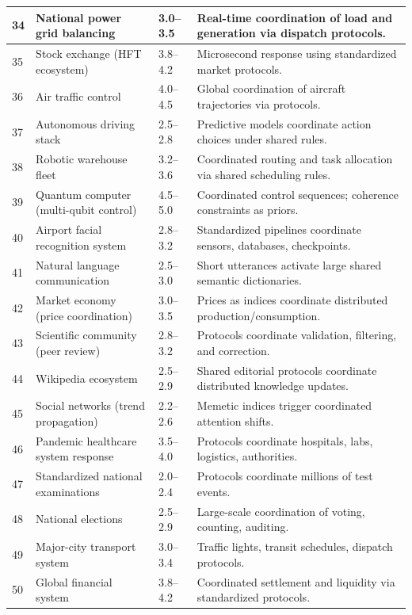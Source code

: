 \documentclass[13pt,a4paper]{article}
\begin{document}
\begin{longtable}{|p{0.8cm}|p{6.2cm}|p{3.0cm}|p{5.7cm}|}
		\hline
		34 & National power grid balancing & 3.0--3.5 & Real-time coordination of load and generation via dispatch protocols. \\
		\hline
		35 & Stock exchange (HFT ecosystem) & 3.8--4.2 & Microsecond response using standardized market protocols. \\
		\hline
		36 & Air traffic control & 4.0--4.5 & Global coordination of aircraft trajectories via protocols. \\
		\hline
		37 & Autonomous driving stack & 2.5--2.8 & Predictive models coordinate action choices under shared rules. \\
		\hline
		38 & Robotic warehouse fleet & 3.2--3.6 & Coordinated routing and task allocation via shared scheduling rules. \\
		\hline
		39 & Quantum computer (multi-qubit control) & 4.5--5.0 & Coordinated control sequences; coherence constraints as priors. \\
		\hline
		40 & Airport facial recognition system & 2.8--3.2 & Standardized pipelines coordinate sensors, databases, checkpoints. \\
		\hline
		41 & Natural language communication & 2.5--3.0 & Short utterances activate large shared semantic dictionaries. \\
		\hline
		42 & Market economy (price coordination) & 3.0--3.5 & Prices as indices coordinate distributed production/consumption. \\
		\hline
		43 & Scientific community (peer review) & 2.8--3.2 & Protocols coordinate validation, filtering, and correction. \\
		\hline
		44 & Wikipedia ecosystem & 2.5--2.9 & Shared editorial protocols coordinate distributed knowledge updates. \\
		\hline
		45 & Social networks (trend propagation) & 2.2--2.6 & Memetic indices trigger coordinated attention shifts. \\
		\hline
		46 & Pandemic healthcare system response & 3.5--4.0 & Protocols coordinate hospitals, labs, logistics, authorities. \\
		\hline
		47 & Standardized national examinations & 2.0--2.4 & Protocols coordinate millions of test events. \\
		\hline
		48 & National elections & 2.5--2.9 & Large-scale coordination of voting, counting, auditing. \\
		\hline
		49 & Major-city transport system & 3.0--3.4 & Traffic lights, transit schedules, dispatch protocols. \\
		\hline
		50 & Global financial system & 3.8--4.2 & Coordinated settlement and liquidity via standardized protocols. \\
		\hline
	\end{longtable}
	
\end{document}
